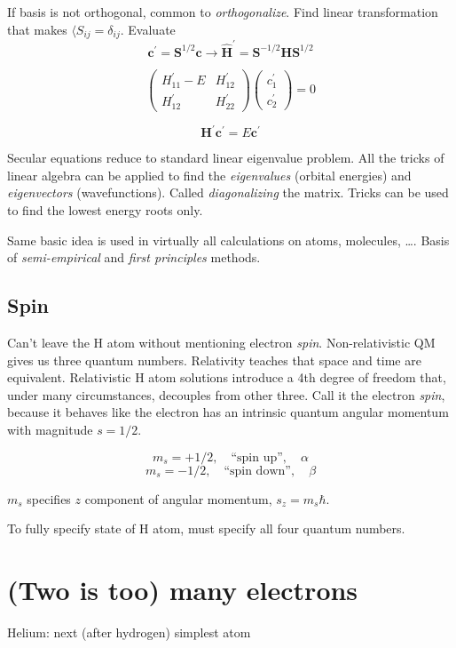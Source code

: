 \documentclass[11pt]{article}
\begin{document}
If basis is not orthogonal, common to \emph{orthogonalize}.  Find linear transformation that makes \(\langle S_{ij} = \delta_{ij}\).  Evaluate
\[ \bm{c}^\prime = \bm{S}^{1/2} \bm{c} \rightarrow \hat{\bm{H}}^\prime = \bm{S}^{-1/2}\bm{H}\bm{S}^{1/2}\]

\[
\left(\begin{array}{cc}
H^\prime_{11} - E & H^\prime_{12}\\
H^\prime_{12} & H^\prime_{22} 
\end{array}\right)\left(
\begin{array}{c} c^\prime_1 \\c^\prime_2\end{array}\right) =0
\]

\[\bm{H}^\prime\bm{c}^\prime = E \bm{c}^\prime \]

Secular equations reduce to standard linear eigenvalue problem.  All the tricks of linear
algebra can be applied to find the \emph{eigenvalues} (orbital energies) and \emph{eigenvectors}
(wavefunctions).  Called \emph{diagonalizing} the matrix.  Tricks can be used to find the
lowest energy roots only.

Same basic idea is used in virtually all calculations on atoms, molecules, \ldots.  Basis
of \emph{semi-empirical} and \emph{first principles} methods.

\subsection{Spin}
\label{sec:org762b539}
Can't leave the H atom without mentioning electron \emph{spin}.  Non-relativistic QM gives us three quantum numbers. Relativity teaches that space and time are equivalent. Relativistic H atom solutions introduce a 4th degree of freedom that, under many circumstances, decouples from other three.  Call it the electron \emph{spin}, because it behaves like the electron has an intrinsic quantum angular momentum with magnitude \(s = 1/2\).

\[m_s = +1/2, \quad\text{``spin up''},\quad\alpha\]
\[m_s = -1/2, \quad\text{``spin down''},\quad\beta\]

\(m_s\) specifies \(z\) component of angular momentum, \(s_z = m_s\hbar\).

To fully specify state of H atom, must specify all four quantum numbers.
\newpage

\section{(Two is too) many electrons}
\label{sec:orge3c1676}
Helium: next (after hydrogen) simplest atom
\end{document}
